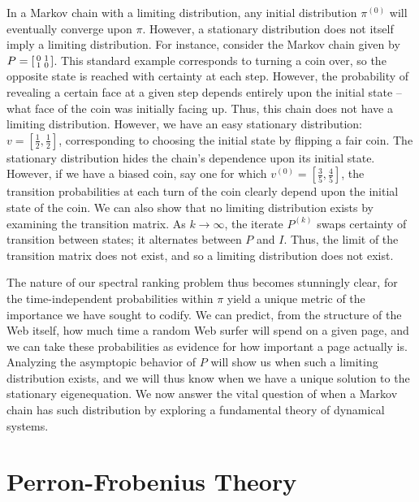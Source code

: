 \documentclass[11pt,letterpaper]{amsart}
\newcommand{\iterate}[2]{#1^{(#2)}}
\begin{document}
In a Markov chain with a limiting distribution, any initial distribution
$\iterate{\pi}{0}$ will eventually converge upon $\pi$. However, a stationary
distribution does not itself imply a limiting distribution. For instance,
consider the Markov chain given by
$P=\begin{bsmallmatrix} 0 & 1 \\ 1 & 0 \end{bsmallmatrix}$. This standard
example corresponds to turning a coin over, so the opposite state is reached
with certainty at each step. However, the probability of revealing a certain
face at a given step depends entirely upon the initial state -- what face of the
coin was initially facing up. Thus, this chain does not have a limiting
distribution. However, we have an easy stationary distribution:
$v = [\frac{1}{2}, \frac{1}{2}]$, corresponding to choosing the initial state by
flipping a fair coin. The stationary distribution hides the chain's dependence
upon its initial state. However, if we have a biased coin, say one for which
$\iterate{v}{0} = [\frac{3}{5}, \frac{4}{5}]$, the transition probabilities at
each turn of the coin clearly depend upon the initial state of the coin. We can
also show that no limiting distribution exists by examining the transition
matrix. As $k\to\infty$, the iterate $\iterate{P}{k}$ swaps certainty of
transition between states; it alternates between $P$ and $I$. Thus, the limit of
the transition matrix does not exist, and so a limiting distribution does not
exist.

The nature of our spectral ranking problem thus becomes stunningly clear, for
the time-independent probabilities within $\pi$ yield a unique metric of the
importance we have sought to codify. We can predict, from the structure of the
Web itself, how much time a random Web surfer will spend on a given page, and we
can take these probabilities as evidence for how important a page actually is.
Analyzing the asymptopic behavior of $P$ will show us when such a limiting
distribution exists, and we will thus know when we have a unique solution to the
stationary eigenequation. We now answer the vital question of when a Markov
chain has such distribution by exploring a fundamental theory of dynamical
systems.




\section{Perron-Frobenius Theory}
\end{document}
